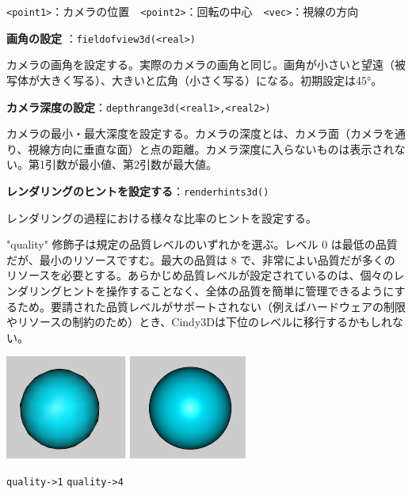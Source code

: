 \documentclass[papersize,a4paper,12pt,uplatex]{jsarticle}
\begin{document}
\verb|<point1>|：カメラの位置　\verb|<point2>|：回転の中心　\verb|<vec>|：視線の方向

\hypertarget{fieldofview3d}{}
\vspace{\baselineskip}
\noindent
{\bf 画角の設定 }：\verb|fieldofview3d(<real>)|

カメラの画角を設定する。実際のカメラの画角と同じ。画角が小さいと望遠（被写体が大きく写る）、大きいと広角（小さく写る）になる。初期設定は45°。

\hypertarget{depthrange3d}{}
\vspace{\baselineskip}
\noindent
{\bf カメラ深度の設定}：\verb|depthrange3d(<real1>,<real2>)|

カメラの最小・最大深度を設定する。カメラの深度とは、カメラ面（カメラを通り、視線方向に垂直な面）と点の距離。カメラ深度に入らないものは表示されない。第1引数が最小値、第2引数が最大値。

\hypertarget{renderhints3d}{}
\vspace{\baselineskip}
\noindent
{\bf レンダリングのヒントを設定する}：\verb|renderhints3d()|

レンダリングの過程における様々な比率のヒントを設定する。

\vspace{\baselineskip}
 

"quality" 修飾子は規定の品質レベルのいずれかを選ぶ。レベル 0 は最低の品質だが、最小のリソースですむ。最大の品質は 8 で、非常によい品質だが多くのリソースを必要とする。あらかじめ品質レベルが設定されているのは、個々のレンダリングヒントを操作することなく、全体の品質を簡単に管理できるようにするため。要請された品質レベルがサポートされない（例えばハードウェアの制限やリソースの制約のため）とき、Cindy3Dは下位のレベルに移行するかもしれない。

\vspace{\baselineskip}
\hspace{20mm} \includegraphics[bb=0 0 600 256 , width=8cm]{Cfig/render.png}

\hspace{30mm}\verb|quality->1| \hspace{20mm} \verb|quality->4|
\end{document}
